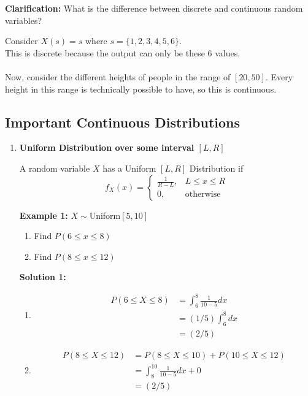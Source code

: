 \documentclass[12pt]{article}
\begin{document}
\textbf{Clarification: } What is the difference between discrete and continuous random variables?

Consider $X(s) = s$ where $s = \{1,2,3,4,5,6 \}$.\\
This is discrete because the output can only be these 6 values.\\
\\
Now, consider the different heights of people in the range of $[20,50]$. Every height in this range is technically possible to have, so this is continuous.

\subsection{Important Continuous Distributions}

\begin{enumerate}
	\item{
	\textbf{Uniform Distribution over some interval $[L,R]$}
	
	\begin{tcolorbox}[title=Defintion: Uniform Distribution]
		A random variable $X$ has a Uniform $[L,R]$ Distribution if 
		$$f_X (x) = \begin{cases}
		\frac{1}{R-L} , & L \leq x \leq R\\
		0 , & \text{otherwise}
		\end{cases}$$
	\end{tcolorbox}

	\textbf{Example 1:} $X \sim $Uniform$[5,10]$
	\begin{enumerate}
		\item{Find $P(6 \leq x \leq 8)$}
		\item{Find $P(8 \leq x \leq 12)$}
	\end{enumerate}
	
	\textbf{Solution 1:}
	\begin{enumerate}
		\item{
		\begin{align*}
			P(6 \leq X \leq 8) &= \int^{8}_{6} \frac{1}{10-5} dx\\
			&= (1/5) \int^{8}_{6} dx\\
			&= (2/5)
		\end{align*}
		}
		\item{
		\begin{align*}
			P(8 \leq X \leq 12) &= P(8 \leq X \leq 10) + P(10 \leq X \leq 12)\\
			&= \int^{10}_{8} \frac{1}{10-5} dx + 0\\
			&= (2/5)
		\end{align*}
		}
	\end{enumerate}
	}
	

\end{enumerate}
\end{document}
